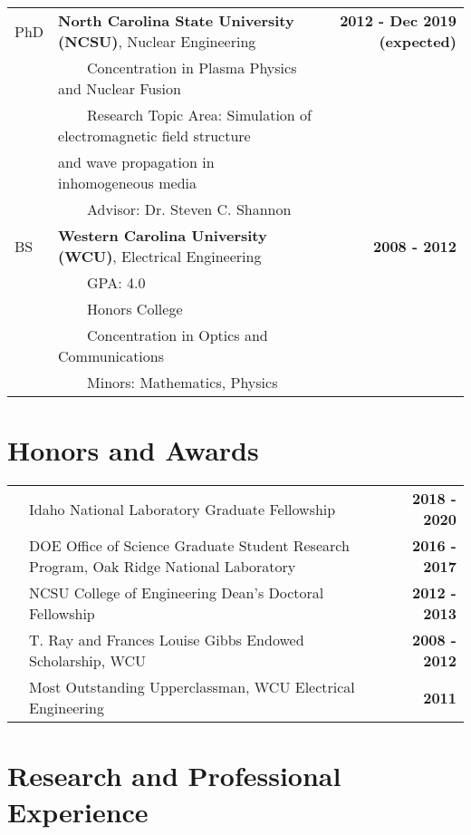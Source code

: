 \documentclass{article}
\newcommand{\tabitem}{~~\textbullet~~}
\begin{document}
	\begin{tabularx}{\textwidth}{l X r}
	PhD 		 & \textbf{North Carolina State University (NCSU)}, Nuclear Engineering &  \textbf{2012 - Dec 2019 (expected)} \\
				 & \tabitem Concentration in Plasma Physics and Nuclear Fusion & \\
				 & \tabitem Research Topic Area: Simulation of electromagnetic field structure & \\
				 & \hspace{1.5em} and wave propagation in inhomogeneous media & \\
				 & \tabitem Advisor: Dr. Steven C. Shannon & \\
	BS			 & \textbf{Western Carolina University (WCU)}, Electrical Engineering  & \textbf{2008 - 2012} \\
				 & \tabitem GPA: 4.0 & \\
				 & \tabitem Honors College & \\
				 & \tabitem Concentration in Optics and Communications & \\
				 & \tabitem Minors: Mathematics, Physics &
	\end{tabularx}

\section*{Honors and Awards}

	\begin{tabularx}{\textwidth}{l X r}
		\hspace{2em} & Idaho National Laboratory Graduate Fellowship & \textbf{2018 - 2020} \\
					 & DOE Office of Science Graduate Student Research Program, Oak Ridge National Laboratory & \textbf{2016 - 2017} \\
					 & NCSU College of Engineering Dean's Doctoral Fellowship & \textbf{2012 - 2013} \\
					 & T. Ray and Frances Louise Gibbs Endowed Scholarship, WCU & \textbf{2008 - 2012} \\
					 & Most Outstanding Upperclassman, WCU Electrical Engineering & \textbf{2011}				 
	\end{tabularx}

\section*{Research and Professional Experience}
\end{document}
